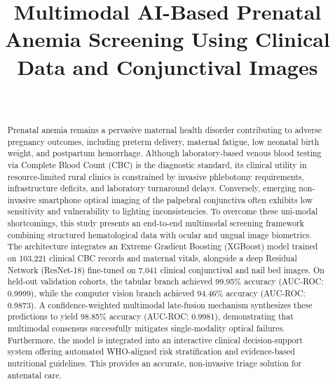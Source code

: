 \documentclass[journal,10pt,twocolumn]{IEEEtran}
\begin{document}
\title{Multimodal AI-Based Prenatal Anemia Screening Using Clinical Data and Conjunctival Images}

\author{
     \\
}

\maketitle

\begin{abstract}
Prenatal anemia remains a pervasive maternal health disorder contributing to adverse pregnancy outcomes, including preterm delivery, maternal fatigue, low neonatal birth weight, and postpartum hemorrhage. Although laboratory-based venous blood testing via Complete Blood Count (CBC) is the diagnostic standard, its clinical utility in resource-limited rural clinics is constrained by invasive phlebotomy requirements, infrastructure deficits, and laboratory turnaround delays. Conversely, emerging non-invasive smartphone optical imaging of the palpebral conjunctiva often exhibits low sensitivity and vulnerability to lighting inconsistencies. To overcome these uni-modal shortcomings, this study presents an end-to-end multimodal screening framework combining structured hematological data with ocular and ungual image biometrics. The architecture integrates an Extreme Gradient Boosting (XGBoost) model trained on 103,221 clinical CBC records and maternal vitals, alongside a deep Residual Network (ResNet-18) fine-tuned on 7,041 clinical conjunctival and nail bed images. On held-out validation cohorts, the tabular branch achieved 99.95\% accuracy (AUC-ROC: 0.9999), while the computer vision branch achieved 94.46\% accuracy (AUC-ROC: 0.9873). A confidence-weighted multimodal late-fusion mechanism synthesizes these predictions to yield 98.85\% accuracy (AUC-ROC: 0.9981), demonstrating that multimodal consensus successfully mitigates single-modality optical failures. Furthermore, the model is integrated into an interactive clinical decision-support system offering automated WHO-aligned risk stratification and evidence-based nutritional guidelines. This provides an accurate, non-invasive triage solution for antenatal care.
\end{abstract}
\end{document}
